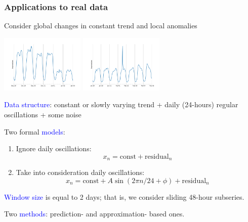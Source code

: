 \documentclass[intlimits, 9pt, unicode]{beamer}
\newcommand{\textblue}[1]{\textcolor{blue}{#1}}
\begin{document}
\begin{frame}
    \frametitle{Applications to real data}
    
    Consider global changes in constant trend and local anomalies

\medskip    
    \includegraphics[width = 4cm]{images/cp_mean_2}\qquad
    \includegraphics[width = 4cm]{images/005_point}

\medskip
\textblue{Data structure}: constant or slowly varying trend + daily (24-hours) regular oscillations + some noise

\medskip
Two formal \textblue{models}:

\medskip
\begin{enumerate}
\item
Ignore daily oscillations:
$$ x_n = \mathrm{const} + \mathrm{residual}_n $$
\item
Take into consideration daily oscillations:
$$ x_n = \mathrm{const} + A\sin(2\pi n/24+\phi) + \mathrm{residual}_n $$
\end{enumerate}

\medskip
\textblue{Window size} is equal to 2 days; that is, we consider sliding 48-hour subseries.

\medskip
Two \textblue{methods}: prediction- and approximation- based ones.

 \end{frame}
\end{document}
